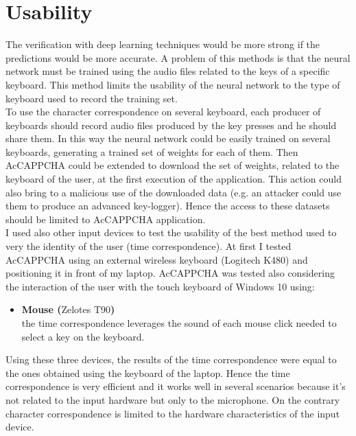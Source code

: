 \section{Usability}
The verification with deep learning techniques would be more strong if the predictions would be more accurate. A problem of this methods is that the neural network must be trained using the audio files related to the keys of a specific keyboard. This method limits the usability of the neural network to the type of keyboard used to record the training set.\\
To use the character correspondence on several keyboard, each producer of keyboards should record audio files produced by the key presses and he should share them. In this way the neural network could be easily trained on several keyboards, generating a trained set of weights for each of them. Then AcCAPPCHA could be extended to download the set of weights, related to the keyboard of the user, at the first execution of the application. This action could also bring to a malicious use of the downloaded data (e.g. an attacker could use them to produce an advanced key-logger). Hence the access to these datasets should be limited to AcCAPPCHA application.\\
I used also other input devices to test the usability of the best method used to very the identity of the user (time correspondence). At first I tested AcCAPPCHA using an external wireless keyboard (Logitech K480) and positioning it in front of my laptop. AcCAPPCHA was tested also considering the interaction of the user with the touch keyboard of Windows 10 using:
\begin{itemize}
\item{\textbf{Mouse (}Zelotes T90\textbf{)}\\
the time correspondence leverages the sound of each mouse click needed to select a key on the keyboard.}
\end{itemize}
Using these three devices, the results of the time correspondence were equal to the ones obtained using the keyboard of the laptop. Hence the time correspondence is very efficient and it works well in several scenarios because it's not related to the input hardware but only to the microphone. On the contrary character correspondence is limited to the hardware characteristics of the input device. 
